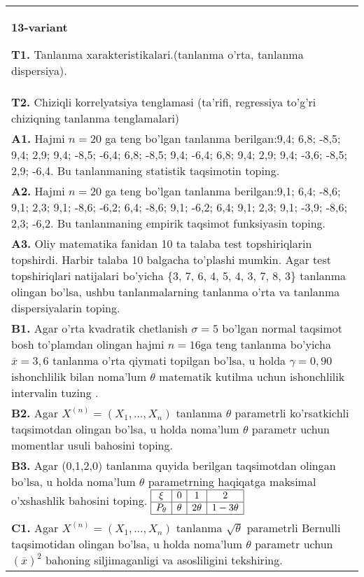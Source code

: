 \documentclass{article}
\begin{document}
\begin{tabular}{m{17cm}}
\textbf{13-variant}
\newline

\textbf{T1.} 
Tanlanma xarakteristikalari.(tanlanma o'rta, tanlanma dispersiya).
\\
\textbf{T2.} 
Chiziqli korrelyatsiya tenglamasi (ta'rifi, regressiya to'g'ri chiziqning tanlanma tenglamalari)
\\
\textbf{A1.} 
Hajmi \(n = 20\) ga teng bo'lgan tanlanma berilgan:9,4; 6,8; -8,5; 9,4; 2,9; 9,4; -8,5; -6,4; 6,8; -8,5; 9,4; -6,4; 6,8; 9,4; 2,9; 9,4; -3,6; -8,5; 2,9; -6,4. Bu tanlanmaning statistik taqsimotin toping.
\\
\textbf{A2.} 
Hajmi \(n = 20\) ga teng bo'lgan tanlanma berilgan:9,1; 6,4; -8,6; 9,1; 2,3; 9,1; -8,6; -6,2; 6,4; -8,6; 9,1; -6,2; 6,4; 9,1; 2,3; 9,1; -3,9; -8,6; 2,3; -6,2. Bu tanlanmaning empirik taqsimot funksiyasin toping.
\\
\textbf{A3.} 
Oliy matematika fanidan 10 ta talaba test topshiriqlarin topshirdi. Harbir talaba 10 balgacha to'plashi mumkin. Agar test topshiriqlari natijalari bo'yicha \{3, 7, 6, 4, 5, 4, 3, 7, 8, 3\} tanlanma olingan bo'lsa, ushbu tanlanmalarning tanlanma o'rta va tanlanma dispersiyalarin toping.
\\
\textbf{B1.} 
Agar o'rta kvadratik chetlanish \(\sigma = 5\) bo'lgan normal taqsimot bosh to'plamdan olingan hajmi \(n = 16\)ga teng tanlanma bo'yicha \(\overline{x} = 3,6\) tanlanma o'rta qiymati topilgan bo'lsa, u holda \(\gamma = 0,90\) ishonchlilik bilan noma'lum \(\theta\) matematik kutilma uchun ishonchlilik intervalin tuzing .
\\
\textbf{B2.} 
Agar \(X^{(n)} = \left( X_{1},...,X_{n} \right)\) tanlanma \(\theta\) parametrli ko'rsatkichli taqsimotdan olingan bo'lsa, u holda noma'lum \(\theta\) parametr uchun momentlar usuli bahosini toping.
\\
\textbf{B3.} 
Agar (0,1,2,0) tanlanma quyida berilgan taqsimotdan olingan bo'lsa, u holda noma'lum \(\theta\) parametrning haqiqatga maksimal o'xshashlik bahosini toping.
$\begin{array}{|c|c|c|c|}
    \hline
    \xi & 0 & 1 & 2 \\
    \hline
    P_{\theta} & \theta & 2\theta & 1 - 3\theta \\
    \hline
\end{array}$
\\
\textbf{C1.} 
Agar \(X^{(n)} = \left( X_{1},...,X_{n} \right)\) tanlanma \(\sqrt{\theta}\) parametrli Bernulli taqsimotidan olingan bo'lsa, u holda noma'lum \(\theta\) parametr uchun \((\overline{x})^{2}\) bahoning siljimaganligi va asosliligini tekshiring.

\end{tabular}
\end{document}
